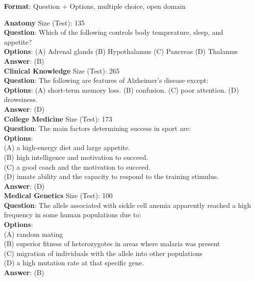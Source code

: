 \documentclass{article}
\begin{document}
\begin{myboxnote}
    \textbf{Format}: Question + Options, multiple choice, open domain \\

    \tcblower
    
    \textbf{Anatomy} Size (Test): 135 \\
    \textbf{Question}: Which of the following controls body temperature, sleep, and appetite? \\
    \textbf{Options}: (A) Adrenal glands (B) Hypothalamus (C) Pancreas (D) Thalamus \\
    \textbf{Answer}: (B) \\

    \textbf{Clinical Knowledge} Size (Test): 265 \\
    \textbf{Question}: The following are features of Alzheimer’s disease except: \\
    \textbf{Options}: (A) short-term memory loss. (B) confusion. (C) poor attention. (D) drowsiness. \\
    \textbf{Answer}: (D) \\
    
    \textbf{College Medicine} Size (Test): 173 \\
    \textbf{Question}: The main factors determining success in sport are: \\ 
    \textbf{Options}: \\ (A) a high-energy diet and large appetite. \\
    (B) high intelligence and motivation to succeed. \\ (C) a good coach and the motivation to succeed. \\ (D) innate ability and the capacity to respond to the training stimulus. \\
    \textbf{Answer}: (D) \\
    
    \textbf{Medical Genetics} Size (Test): 100 \\ 
    \textbf{Question}: The allele associated with sickle cell anemia apparently reached a high frequency in some human populations due to: \\
    \textbf{Options}: \\ (A) random mating \\ (B) superior fitness of heterozygotes in areas where malaria was present \\ (C) migration of individuals with the allele into other populations \\ (D) a high mutation rate at that specific gene. \\
    \textbf{Answer}: (B) \\
    

\end{myboxnote}
\end{document}

